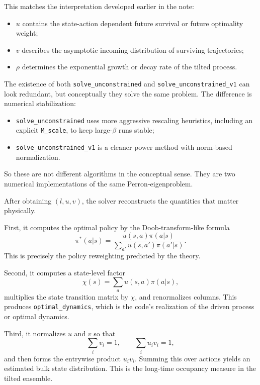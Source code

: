 \documentclass[11pt]{article}
\begin{document}
This matches the interpretation developed earlier in the note:
\begin{itemize}
    \item \(u\) contains the state-action dependent future survival or future optimality
    weight;
    \item \(v\) describes the asymptotic incoming distribution of surviving trajectories;
    \item \(\rho\) determines the exponential growth or decay rate of the tilted process.
\end{itemize}

The existence of both \texttt{solve\_unconstrained} and
\texttt{solve\_unconstrained\_v1} can look redundant, but conceptually they solve the same
problem. The difference is numerical stabilization:
\begin{itemize}
    \item \texttt{solve\_unconstrained} uses more aggressive rescaling heuristics, including an
    explicit \texttt{M\_scale}, to keep large-\(\beta\) runs stable;
    \item \texttt{solve\_unconstrained\_v1} is a cleaner power method with norm-based
    normalization.
\end{itemize}
So these are not different algorithms in the conceptual sense. They are two numerical
implementations of the same Perron-eigenproblem.

After obtaining \((l,u,v)\), the solver reconstructs the quantities that matter physically.

First, it computes the optimal policy by the Doob-transform-like formula
\begin{equation}
    \pi^*(a|s)
    =
    \frac{u(s,a)\pi(a|s)}
    {\sum_{a'} u(s,a')\pi(a'|s)}.
\end{equation}
This is precisely the policy reweighting predicted by the theory.

Second, it computes a state-level factor
\begin{equation}
    \chi(s) = \sum_a u(s,a)\pi(a|s),
\end{equation}
multiplies the state transition matrix by \(\chi\), and renormalizes columns. This produces
\texttt{optimal\_dynamics}, which is the code's realization of the driven process or optimal
dynamics.

Third, it normalizes \(u\) and \(v\) so that
\begin{equation}
    \sum_i v_i = 1,
    \qquad
    \sum_i u_i v_i = 1,
\end{equation}
and then forms the entrywise product \(u_i v_i\). Summing this over actions yields an
estimated bulk state distribution. This is the long-time occupancy measure in the tilted
ensemble.
\end{document}
